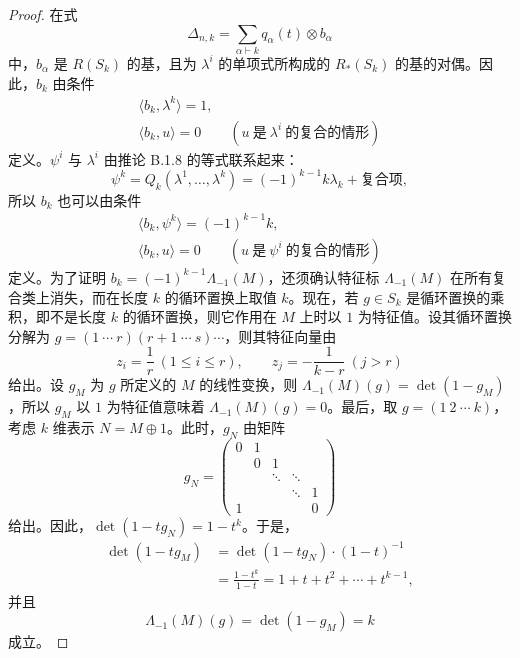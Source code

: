 \begin{proof}
  在式
  \[
    \Delta_{n,k} = \sum_{\alpha\vdash k} q_\alpha(t)\otimes b_\alpha
  \]
  中，$b_\alpha$ 是 $R(S_k)$ 的基，且为 $\lambda^i$ 的单项式所构成的 $R_*(S_k)$ 的基的对偶。因此，$b_k$ 由条件
  \begin{gather*}
    \langle b_k,\lambda^k\rangle = 1,\\
    \langle b_k,u\rangle = 0\qquad
    (u\ \text{是}\ \lambda^i\ \text{的复合的情形})
  \end{gather*}
  定义。$\psi^i$ 与 $\lambda^i$ 由推论 B.1.8 的等式联系起来：
  \[
    \psi^k = Q_k(\lambda^1,\ldots,\lambda^k)
    = (-1)^{k-1}k\lambda_k + \text{复合项},
  \]
  所以 $b_k$ 也可以由条件
  \begin{gather*}
    \langle b_k,\psi^k\rangle = (-1)^{k-1}k,\\
    \langle b_k,u\rangle = 0\qquad
    (u\ \text{是}\ \psi^i\ \text{的复合的情形})
  \end{gather*}
  定义。为了证明 $b_k=(-1)^{k-1}\Lambda_{-1}(M)$，还须确认特征标 $\Lambda_{-1}(M)$ 在所有复合类上消失，而在长度 $k$ 的循环置换上取值 $k$。现在，若 $g\in S_k$ 是循环置换的乘积，即不是长度 $k$ 的循环置换，则它作用在 $M$ 上时以 $1$ 为特征值。设其循环置换分解为 $g=(1\ \cdots\ r)(r+1\ \cdots\ s)\cdots$，则其特征向量由
  \[
    z_i=\frac{1}{r}\ (1\le i\le r),\qquad
    z_j=-\frac{1}{k-r}\ (j>r)
  \]
  给出。设 $g_M$ 为 $g$ 所定义的 $M$ 的线性变换，则 $\Lambda_{-1}(M)(g)=\det(1-g_M)$，所以 $g_M$ 以 $1$ 为特征值意味着 $\Lambda_{-1}(M)(g)=0$。最后，取 $g=(1\ 2\ \cdots\ k)$，考虑 $k$ 维表示 $N=M\oplus 1$。此时，$g_N$ 由矩阵
  \[
    g_N=
    \begin{pmatrix}
      0 & 1 &   &        &   \\
        & 0 & 1 &        &   \\
        &   & \ddots & \ddots &   \\
        &   &   & \ddots & 1 \\
      1 &   &   &        & 0
    \end{pmatrix}
  \]
  给出。因此，$\det(1-tg_N)=1-t^k$。于是，
  \begin{align*}
    \det(1-tg_M) &= \det(1-tg_N)\cdot(1-t)^{-1}\\
    &= \frac{1-t^k}{1-t} = 1+t+t^2+\cdots+t^{k-1},
  \end{align*}
  并且
  \[
    \Lambda_{-1}(M)(g) = \det(1-g_M) = k
  \]
  成立。
\end{proof}




